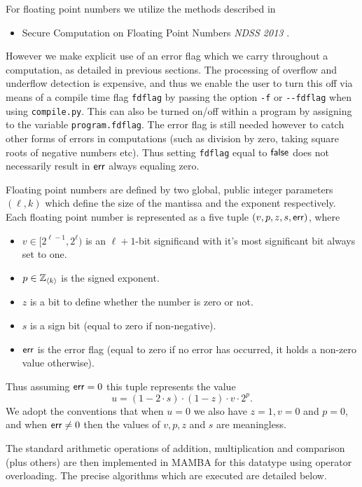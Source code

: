 
  For floating point numbers we utilize the methods described in
  \begin{itemize}
    \item Secure Computation on Floating Point Numbers {\em NDSS 2013} \cite{ABZS13}.
  \end{itemize}
  However we make explicit use of an error flag which we carry throughout
  a computation, as detailed in previous sections.
  The processing of overflow and underflow detection is expensive,
  and thus we enable the user to turn this off via
  means of a compile time flag \verb+fdflag+ by passing the option
  \verb+-f+ or \verb+--fdflag+ when using \verb|compile.py|.
  This can also be turned on/off within a program by assigning
  to the variable \verb+program.fdflag+.
  The error flag is still needed however to catch other forms of errors
  in computations (such as division by zero, taking square roots of
  negative numbers etc).
  Thus setting \verb+fdflag+ equal to ${\mathsf{false}}$
  does not necessarily result in $\mathsf{err}$ always equaling zero.

  Floating point numbers are defined by two global, public integer parameters
$(\ell,k)$ which define the size of the mantissa and the exponent respectively.
  Each floating point number is represented as a five tuple $(v,p,z,s,\mathsf{err})$, where
  \begin{itemize}
    \item $v \in [2^{\ell-1},2^\ell)$ is an $\ell+1$-bit significand with it's most
          significant bit always set to one.
    \item $p \in {\mathbb{Z}}_{\langle k \rangle}$ is the signed exponent.
    \item $z$ is a bit to define whether the number is zero or not.
    \item $s$ is a sign bit (equal to zero if non-negative).
    \item $\mathsf{err}$ is the error flag (equal to zero if no error has occurred, it holds a non-zero value otherwise).
  \end{itemize}
  Thus assuming $\mathsf{err}=0$ this tuple represents the value
  \[ u=(1- 2 \cdot s) \cdot (1-z) \cdot v \cdot 2^p. \]
  We adopt the conventions that when $u=0$ we also have $z=1, v=0$ and $p=0$,
  and when $\mathsf{err} \ne 0$ then the values of $v,p,z$ and $s$ are meaningless.

  The standard arithmetic operations of addition, multiplication and
  comparison (plus others) are then implemented in MAMBA for this datatype using
  operator overloading. The precise algorithms which are executed
  are detailed below.

